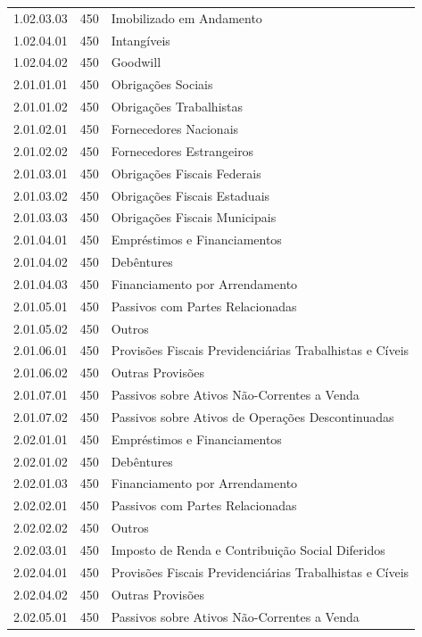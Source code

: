 \begin{table}[ht]
\begin{tabular}{lrl}
  1.02.03.03 & 450 & Imobilizado em Andamento \\ 
  1.02.04.01 & 450 & Intangíveis \\ 
  1.02.04.02 & 450 & Goodwill \\ 
  2.01.01.01 & 450 & Obrigações Sociais \\ 
  2.01.01.02 & 450 & Obrigações Trabalhistas \\ 
  2.01.02.01 & 450 & Fornecedores Nacionais \\ 
  2.01.02.02 & 450 & Fornecedores Estrangeiros \\ 
  2.01.03.01 & 450 & Obrigações Fiscais Federais \\ 
  2.01.03.02 & 450 & Obrigações Fiscais Estaduais \\ 
  2.01.03.03 & 450 & Obrigações Fiscais Municipais \\ 
  2.01.04.01 & 450 & Empréstimos e Financiamentos \\ 
  2.01.04.02 & 450 & Debêntures \\ 
  2.01.04.03 & 450 & Financiamento por Arrendamento \\ 
  2.01.05.01 & 450 & Passivos com Partes Relacionadas \\ 
  2.01.05.02 & 450 & Outros \\ 
  2.01.06.01 & 450 & Provisões Fiscais Previdenciárias Trabalhistas e Cíveis \\ 
  2.01.06.02 & 450 & Outras Provisões \\ 
  2.01.07.01 & 450 & Passivos sobre Ativos Não-Correntes a Venda \\ 
  2.01.07.02 & 450 & Passivos sobre Ativos de Operações Descontinuadas \\ 
  2.02.01.01 & 450 & Empréstimos e Financiamentos \\ 
  2.02.01.02 & 450 & Debêntures \\ 
  2.02.01.03 & 450 & Financiamento por Arrendamento \\ 
  2.02.02.01 & 450 & Passivos com Partes Relacionadas \\ 
  2.02.02.02 & 450 & Outros \\ 
  2.02.03.01 & 450 & Imposto de Renda e Contribuição Social Diferidos \\ 
  2.02.04.01 & 450 & Provisões Fiscais Previdenciárias Trabalhistas e Cíveis \\ 
  2.02.04.02 & 450 & Outras Provisões \\ 
  2.02.05.01 & 450 & Passivos sobre Ativos Não-Correntes a Venda \\ 

\end{tabular}
\end{table}

